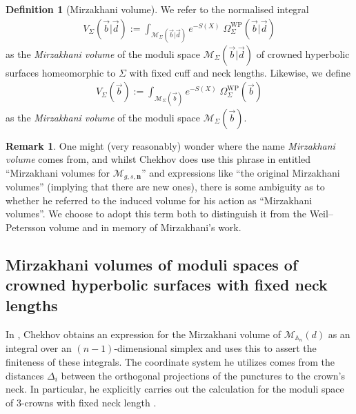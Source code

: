 \documentclass{amsart}
\theoremstyle{definition}
\newtheorem{definition}[proposition]{Definition}
\newtheorem{remark}[proposition]{Remark}
\begin{document}
\begin{definition}[Mirzakhani volume]\label{defn:mirzvolume}
We refer to the normalised integral
\begin{align*}
    V_{\Sigma}(\vec{b}|\vec{d}):=
    \int_{\mathcal{M}_{\Sigma}(\vec{b}|\vec{d})} e^{-S(X)}\;\Omega^{\mathrm{WP}}_{\Sigma}(\vec{b}|\vec{d})
\end{align*}
as the \emph{Mirzakhani volume} of the moduli space $\mathcal{M}_{\Sigma}(\vec{b}|\vec{d})$ of crowned hyperbolic surfaces homeomorphic to $\Sigma$ with fixed cuff and neck lengths. Likewise, we define
\begin{align*}
    V_{\Sigma}(\vec{b})
    :=\int_{\mathcal{M}_{\Sigma}(\vec{b})} e^{-S(X)}\;\Omega^{\mathrm{WP}}_{\Sigma}(\vec{b})
\end{align*}
as the \emph{Mirzakhani volume} of the moduli space $\mathcal{M}_{\Sigma}(\vec{b})$.
\end{definition}

\begin{remark}
    One might (very reasonably) wonder where the name \emph{Mirzakhani volume} comes from, and whilst Chekhov does use this phrase in \cite[Section~2.3]{chekhov2024} entitled ``Mirzakhani volumes for $\mathcal{M}_{g,s,\mathbf{n}}$'' and expressions like ``the original Mirzakhani volumes'' (implying that there are new ones), there is some ambiguity as to whether he referred to the induced volume for his action as ``Mirzakhani volumes''. We choose to adopt this term both to distinguish it from the Weil--Petersson volume and in memory of Mirzakhani's work.
\end{remark}





\subsection{Mirzakhani volumes of moduli spaces of crowned hyperbolic surfaces with fixed neck lengths}

In \cite[Theorem~2.4]{chekhov2024}, Chekhov obtains an expression for the Mirzakhani volume of $\mathcal{M}_{\mathbb{A}_n}(d)$ as an integral over an $(n-1)$-dimensional simplex and uses this to assert the finiteness of these integrals. The coordinate system he utilizes comes from the distances $\Delta_i$ between the orthogonal projections of the punctures to the crown's neck. In particular, he explicitly carries out the calculation for the moduli space of $3$-crowns with fixed neck length \cite[Section~2.5]{chekhov2024}.\medskip 
\end{document}
